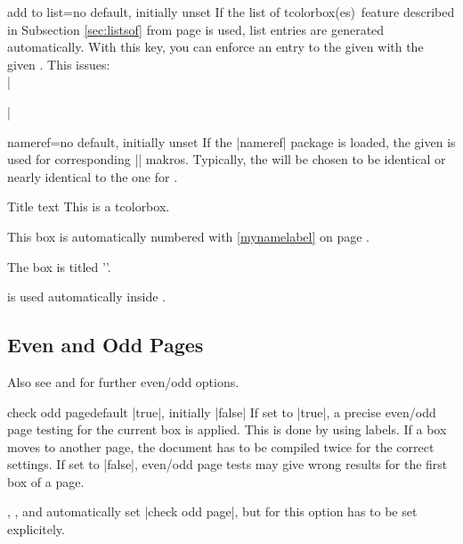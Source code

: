 \begin{docTcbKey}{add to list}{=}{no default, initially unset}
If the \flqq list of tcolorbox(es)\frqq\ feature described in Subsection
\ref{sec:listsof} from page \pageref{sec:listsof} is used, list entries are
generated automatically. With this key, you can enforce an entry to the
given  with the given .
This issues:\\
|\addcontentsline|
\end{docTcbKey}


\begin{docTcbKey}[][doc new and updated={2016-06-22}{2016-11-18}]{nameref}{=}{no default, initially unset}
If the |nameref| package is loaded, the given  is used for
corresponding |\nameref| makros. Typically, the  will be chosen
to be identical or nearly identical to the one for .


\begin{dispExample}
\begin{pabox}[label={mynamelabel},nameref={Title or anything else}]{Title text}
This is a tcolorbox.
\end{pabox}
This box is automatically numbered with \ref{mynamelabel} on page
\pageref{mynamelabel}.

The box is titled ''.
\end{dispExample}

\begin{marker}
 is used automatically inside .
\end{marker}

\end{docTcbKey}


\clearpage
\subsection{Even and Odd Pages}

\begin{marker}
Also see
 and
for further even/odd options.
\end{marker}

\begin{docTcbKey}[][doc updated=2015-11-13]{check odd page}{}{default |true|, initially |false|}
If set to |true|, a precise even/odd page testing for the current box
is applied. This is done by using labels. If a box moves to another page,
the document has to be compiled twice for the correct settings.
If set to |false|, even/odd page tests may give wrong results for the first box
of a page.

,
, and
automatically set |check odd page|, but for
 this option has to be set explicitely.
\end{docTcbKey}

